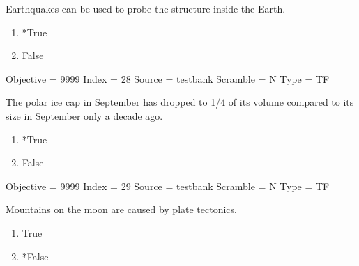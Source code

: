 \documentclass[11pt]{article}
\begin{document}
\begin{enumerate}
\begin{minipage}{\textwidth}
\begin{minipage}{\textwidth}
\item Earthquakes can be used to probe the structure inside the Earth.
\begin{multicols}{3}
\begin{enumerate} 
\setlength{\itemsep}{1pt} 
\setlength{\parskip}{0pt} 
\setlength{\parsep}{0pt}
\setlength{\multicolsep}{1pt} 
\item *True
\item False
\end{enumerate} 
\vfill 
\end{multicols}

Objective = 9999
Index = 28
Source = testbank
Scramble = N
Type = TF
\end{minipage}
\end{minipage}
\vskip 0.20in

\begin{minipage}{\textwidth}
\begin{minipage}{\textwidth}
\item The polar ice cap in September has dropped to 1/4 of its volume compared to its size in September only a decade ago.
\begin{multicols}{3}
\begin{enumerate} 
\setlength{\itemsep}{1pt} 
\setlength{\parskip}{0pt} 
\setlength{\parsep}{0pt}
\setlength{\multicolsep}{1pt} 
\item *True
\item False
\end{enumerate} 
\vfill 
\end{multicols}

Objective = 9999
Index = 29
Source = testbank
Scramble = N
Type = TF
\end{minipage}
\end{minipage}
\vskip 0.20in

\begin{minipage}{\textwidth}
\begin{minipage}{\textwidth}
\item Mountains on the moon are caused by plate tectonics.
\begin{multicols}{3}
\begin{enumerate} 
\setlength{\itemsep}{1pt} 
\setlength{\parskip}{0pt} 
\setlength{\parsep}{0pt}
\setlength{\multicolsep}{1pt} 
\item True
\item *False
\end{enumerate} 
\vfill 
\end{multicols}


\end{minipage}
\end{minipage}
\end{enumerate}
\end{document}
